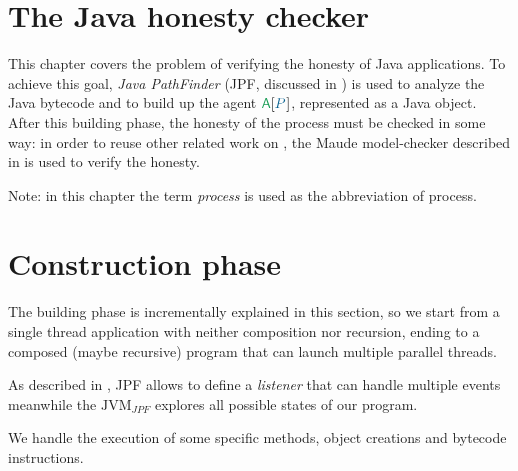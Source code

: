 
\section{The Java honesty checker}\label{sec:java-honesty}

This chapter covers the problem of verifying the honesty of Java applications.
To achieve this goal, \textit{Java PathFinder} (JPF, discussed in ) is used to analyze the Java bytecode and to build up the agent $\sys{\pmv{A}}{\procP}$, represented as a Java object.
After this building phase, the honesty of the process must be checked in some way: in order to reuse other related work on \coco, the Maude model-checker described in  is used to verify the honesty.

Note: in this chapter the term \textit{process} is used as the abbreviation of \coco process.

\section{Construction phase}\label{sec:construction-phase}
The building phase is incrementally explained in this section, so we start from a single thread application with neither composition nor recursion, ending to a composed (maybe recursive) program that can launch multiple parallel threads.

As described in , JPF allows to define a \emph{listener} that can handle multiple events meanwhile the $\text{JVM}_{JPF}$ explores all possible states of our program. 

We handle the execution of some specific methods, object creations and bytecode instructions.


